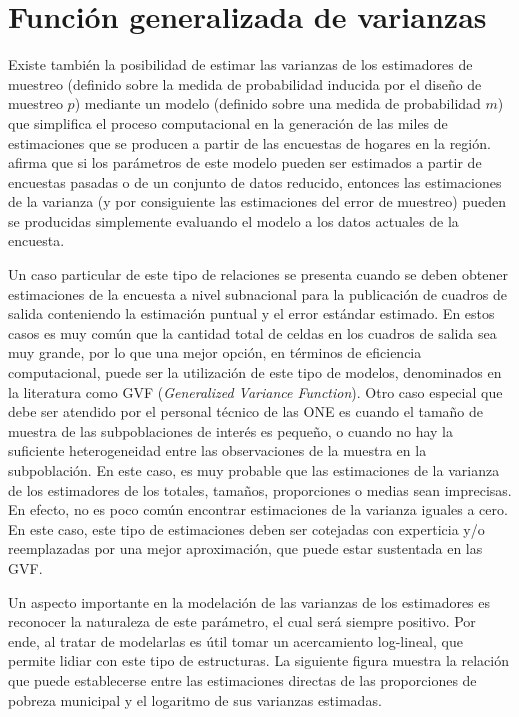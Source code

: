 \documentclass[
  12pt,
]{book}
\begin{document}
\hypertarget{funciuxf3n-generalizada-de-varianzas}{%
\section{Función generalizada de varianzas}\label{funciuxf3n-generalizada-de-varianzas}}

Existe también la posibilidad de estimar las varianzas de los estimadores de muestreo (definido sobre la medida de probabilidad inducida por el diseño de muestreo \(p\)) mediante un modelo (definido sobre una medida de probabilidad \(m\)) que simplifica el proceso computacional en la generación de las miles de estimaciones que se producen a partir de las encuestas de hogares en la región. \citet{Wolter_2007} afirma que si los parámetros de este modelo pueden ser estimados a partir de encuestas pasadas o de un conjunto de datos reducido, entonces las estimaciones de la varianza (y por consiguiente las estimaciones del error de muestreo) pueden se producidas simplemente evaluando el modelo a los datos actuales de la encuesta.

Un caso particular de este tipo de relaciones se presenta cuando se deben obtener estimaciones de la encuesta a nivel subnacional para la publicación de cuadros de salida conteniendo la estimación puntual y el error estándar estimado. En estos casos es muy común que la cantidad total de celdas en los cuadros de salida sea muy grande, por lo que una mejor opción, en términos de eficiencia computacional, puede ser la utilización de este tipo de modelos, denominados en la literatura como GVF (\emph{Generalized Variance Function}). Otro caso especial que debe ser atendido por el personal técnico de las ONE es cuando el tamaño de muestra de las subpoblaciones de interés es pequeño, o cuando no hay la suficiente heterogeneidad entre las observaciones de la muestra en la subpoblación. En este caso, es muy probable que las estimaciones de la varianza de los estimadores de los totales, tamaños, proporciones o medias sean imprecisas. En efecto, no es poco común encontrar estimaciones de la varianza iguales a cero. En este caso, este tipo de estimaciones deben ser cotejadas con experticia y/o reemplazadas por una mejor aproximación, que puede estar sustentada en las GVF.

Un aspecto importante en la modelación de las varianzas de los estimadores es reconocer la naturaleza de este parámetro, el cual será siempre positivo. Por ende, al tratar de modelarlas es útil tomar un acercamiento log-lineal, que permite lidiar con este tipo de estructuras. La siguiente figura muestra la relación que puede establecerse entre las estimaciones directas de las proporciones de pobreza municipal y el logaritmo de sus varianzas estimadas.
\end{document}
